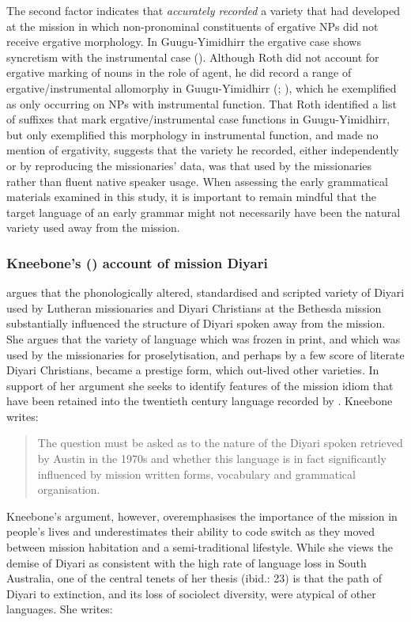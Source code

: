 The second factor indicates that \citet{roth_structure_1901} \textit{accurately recorded} a variety that had developed at the mission in which non-pronominal constituents of ergative NPs did not receive ergative morphology. In Guugu-Yimidhirr the ergative case shows syncretism with the instrumental case (\citealt[47]{haviland_guugu_1979}). Although Roth did not account for ergative marking of nouns in the role of agent, he did record a range of ergative/instrumental allomorphy in Guugu-Yimidhirr (\citeyear[30]{roth_structure_1901}; ), which he exemplified as only occurring on NPs with instrumental function. That Roth identified a list of suffixes that mark ergative/instrumental case functions in Guugu-Yimidhirr, but only exemplified this morphology in instrumental function, and made no mention of ergativity, suggests that the variety he recorded, either independently or by reproducing the missionaries' data, was that used by the missionaries rather than fluent native speaker usage.
When assessing the early grammatical materials examined in this study, it is important to remain mindful that the target language of an early grammar might not necessarily have been the natural variety used away from the mission.

\subsubsection{Kneebone’s (\citeyear{kneebone_language_2005}) account of mission Diyari} 
\label{sec:key:2.5.1.1}

\citet[28,36]{kneebone_language_2005} argues that the phonologically altered, standardised and scripted variety of Diyari used by Lutheran missionaries and Diyari Christians at the Bethesda mission substantially influenced the structure of Diyari spoken away from the mission. She argues that the variety of language which was frozen in print, and which was used by the missionaries for proselytisation, and perhaps by a few score of literate Diyari Christians, became a prestige form, which out-lived other varieties. In support of her argument she seeks to identify features of the mission idiom that have been retained into the twentieth century language recorded by \citet{austin_grammar_1981}. Kneebone writes: 
\begin{quote}
    The question must be asked as to the nature of the Diyari spoken retrieved by Austin in the 1970s and whether this language is in fact significantly influenced by mission written forms, vocabulary and grammatical organisation. \citep[72]{kneebone_language_2005}
\end{quote}
Kneebone’s argument, however, overemphasises the importance of the mission in people’s lives and underestimates their ability to code switch as they moved between mission habitation and a semi-traditional lifestyle. While she views the demise of Diyari as consistent with the high rate of language loss in South Australia, one of the central tenets of her thesis (ibid.: 23) is that the path of Diyari to extinction, and its loss of sociolect diversity, were atypical of other languages. She writes: 

